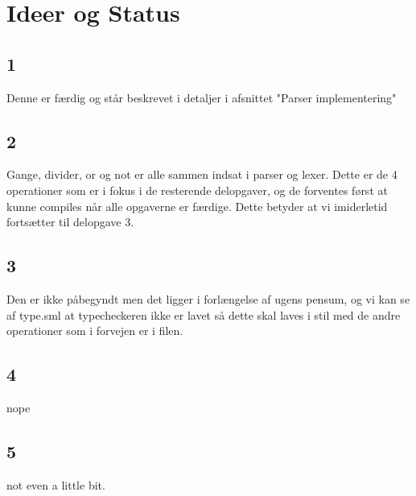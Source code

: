 \documentclass[11pt,a4paper]{article}
\begin{document}
\section*{Ideer og Status}

\subsection{1}
Denne er færdig og står beskrevet i detaljer i afsnittet "Parser implementering"

\subsection{2}
Gange, divider, or og not er alle sammen indsat i parser og lexer. Dette er de 4 operationer som er i fokus i de resterende delopgaver, og de forventes først at kunne compiles når alle opgaverne er færdige.
Dette betyder at vi imiderletid fortsætter til delopgave 3.

\subsection{3}
Den er ikke påbegyndt men det ligger i forlængelse af ugens pensum, og vi kan se af type.sml at typecheckeren ikke er lavet så dette skal laves i stil med de andre operationer som i forvejen er i filen.

\subsection{4}
nope
\subsection{5}
not even a little bit.
\end{document}
